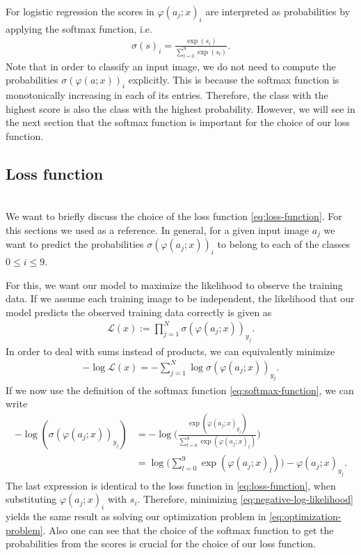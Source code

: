 For logistic regression the scores in $\varphi(a_j;x)_i$ are interpreted as probabilities by applying the softmax function, i.e.
\begin{align}
    \label{eq:softmax-function}
    \sigma(s)_i = \frac{\exp(s_i)}{\sum_{l=0}^{9} \exp(s_l)}.
\end{align}
Note that in order to classify an input image, we do not need to compute the probabilities $\sigma(\varphi(a;x))_i$ explicitly. This is because the softmax function is monotonically increasing in each of its entries. Therefore, the class with the highest score is also the class with the highest probability. However, we will see in the next section that the softmax function is important for the choice of our loss function.

\subsection{Loss function}\;\\
We want to briefly discuss the choice of the loss function \cref{eq:loss-function}. For this sections we used \cite[Section 6.2.2.3]{Goodfellow2016} as a reference. In general, for a given input image $a_j$ we want to predict the probabilities $\sigma(\varphi(a_j;x))_i$ to belong to each of the classes $0 \leq i \leq 9$. 

For this, we want our model to maximize the likelihood to observe the training data. If we assume each training image to be independent, the likelihood that our model predicts the observed training data correctly is given as
\begin{align*}
    \mathcal{L}(x) := \prod_{j=1}^N \sigma(\varphi(a_j;x))_{y_j}.
\end{align*}
In order to deal with sums instead of products, we can equivalently minimize
\begin{align}
    \label{eq:negative-log-likelihood}
    -\log \mathcal{L}(x) = -\sum_{j=1}^N \log \sigma(\varphi(a_j;x))_{y_j}.
\end{align}
If we now use the definition of the softmax function \cref{eq:softmax-function}, we can write
\begin{align*}
    -\log(\sigma(\varphi(a_j;x))_{y_j}) &= -\log\Big(\frac{\exp(\varphi(a_j;x)_{y_j})}{\sum_{l=0}^{9} \exp(\varphi(a_j;x)_l)}\Big) \\ &= \log\Big(\sum_{l=0}^{9} \exp(\varphi(a_j;x)_l)\Big) - \varphi(a_j;x)_{y_j}.
\end{align*}
The last expression is identical to the loss function in \cref{eq:loss-function}, when substituting $\varphi(a_j;x)_i$ with $s_i$. Therefore, minimizing \cref{eq:negative-log-likelihood} yields the same result as solving our optimization problem in \cref{eq:optimization-problem}. Also one can see that the choice of the softmax function to get the probabilities from the scores is crucial for the choice of our loss function.




